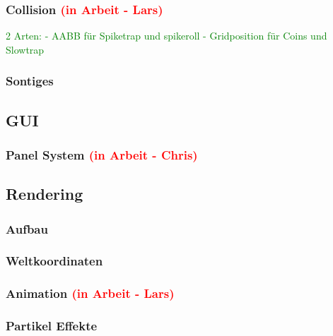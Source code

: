 \documentclass{article}
\begin{document}
\vspace{1cm}
\subsubsection{Collision \textcolor{red}{(in Arbeit - Lars)}}
\textcolor{green}{2 Arten: \newline
- AABB für Spiketrap und spikeroll \newline
- Gridposition für Coins und Slowtrap}

\vspace{1cm}
\subsubsection{Sontiges}

\vspace{2cm}
\subsection{GUI}

\vspace{1cm}
\subsubsection{Panel System \textcolor{red}{(in Arbeit - Chris)}}

\vspace{2cm}
\subsection{Rendering}

\vspace{1cm}
\subsubsection{Aufbau}

\vspace{1cm}
\subsubsection{Weltkoordinaten}

\vspace{1cm}
\subsubsection{Animation \textcolor{red}{(in Arbeit - Lars)}}

\vspace{1cm}
\subsubsection{Partikel Effekte}
\end{document}
